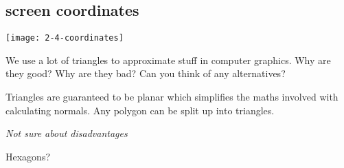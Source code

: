\documentclass{supervision}
\begin{document}
\begin{questions}
\begin{parts}
        \part{screen coordinates}
    \end{parts}
    \begin{solution}
    \begin{center}
        \texttt{[image: 2-4-coordinates]}
    \end{center}
    \end{solution}

    \question
    We use a lot of triangles to approximate stuff in computer graphics. Why are they good? Why are they bad? Can you think of any alternatives?
    \begin{solution}
    Triangles are guaranteed to be planar which simplifies the maths involved with calculating normals. Any polygon can be split up into triangles.
    
    \textit{Not sure about disadvantages}
    
    Hexagons? 
    \end{solution}


\end{questions}
\end{document}
